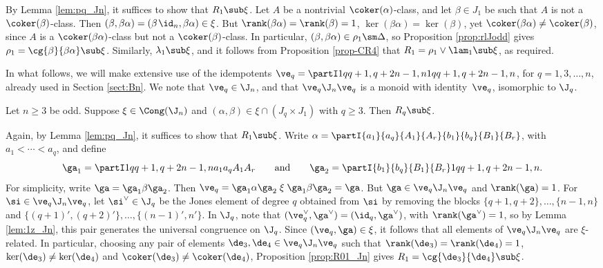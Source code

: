 \pf By Lemma \ref{lem:pq_Jn}, it suffices to show that $R_1\sub\xi$.  Let $A$ be a nontrivial $\coker(\alpha)$-class, and let $\beta\in J_1$ be such that $A$ is not a $\coker(\beta)$-class.  Then $(\beta,\beta\alpha)=(\beta\;\!\id_n,\beta\alpha)\in\xi$.  But $\rank(\beta\alpha)=\rank(\beta)=1$, $\ker(\beta\alpha)=\ker(\beta)$, yet $\coker(\beta\alpha)\not=\coker(\beta)$, since $A$ is a $\coker(\beta\alpha)$-class but not a $\coker(\beta)$-class.  In particular, $(\beta,\beta\alpha)\in\rho_1\sm\Delta$, so Proposition \ref{prop:rlJodd} gives $\rho_1=\cg{\beta}{\beta\alpha}\sub\xi$.  Similarly, $\lambda_1\sub\xi$, and it follows from Proposition \ref{prop-CR4} that $R_1=\rho_1\vee\lam_1\sub\xi$, as required. \epf

In what follows,
we will make extensive use of the idempotents $\ve_q=\partI1q{q+1,q+2}{n-1,n}1q{q+1,q+2}{n-1,n}$, for $q=1,3,\ldots,n$, already used in Section \ref{sect:Bn}.  We note that $\ve_q\in\J_n$, and that $\ve_q\J_n\ve_q$ is a monoid with identity~$\ve_q$, isomorphic to $\J_q$.

%
\begin{lemma}\label{lem:qz_Jn}
Let $n\geq3$ be odd.  Suppose $\xi\in\Cong(\J_n)$ and $(\alpha,\beta)\in\xi\cap (J_q\times J_1)$ with $q\geq3$.  Then $R_q\sub\xi$.
\end{lemma}

\pf Again, by Lemma \ref{lem:pq_Jn}, it suffices to show that $R_1\sub\xi$.  Write $\alpha=\partI{a_1}{a_q}{A_1}{A_r}{b_1}{b_q}{B_1}{B_r}$, with $a_1<\cdots<a_q$, and define
\[
\ga_1=\partI1q{q+1,q+2}{n-1,n}{a_1}{a_q}{A_1}{A_r}
\qquad\text{and}\qquad
\ga_2=\partI{b_1}{b_q}{B_1}{B_r}1q{q+1,q+2}{n-1,n}.
\]
For simplicity, write $\ga=\ga_1\beta\ga_2$.  
%
Then $\ve_q=\ga_1\alpha\ga_2\mathrel\xi\ga_1\beta\ga_2=\ga$.  But $\ga\in\ve_q\J_n\ve_q$ and ${\rank(\ga)=1}$.  
%
For $\si\in\ve_q\J_n\ve_q$, let $\si^\vee\in\J_q$ be the Jones element of degree $q$ obtained from $\si$ by removing the blocks ${\{q+1,q+2\},\ldots,\{n-1,n\}}$ and $\{(q+1)',(q+2)'\},\ldots,\{(n-1)',n'\}$.  
%
In $\J_q$, note that $(\ve_q^\vee,\ga^\vee)=(\id_q,\ga^\vee)$, with ${\rank(\ga^\vee)=1}$, so by Lemma \ref{lem:1z_Jn}, this pair generates the universal congruence on $\J_q$.  Since $(\ve_q,\ga)\in\xi$, it follows that all elements of $\ve_q\J_n\ve_q$ are $\xi$-related.  In particular, choosing any pair of elements $\de_3,\de_4\in\ve_q\J_n\ve_q$ such that $\rank(\de_3)=\rank(\de_4)=1$, $\ker(\de_3)\not=\ker(\de_4)$ and $\coker(\de_3)\not=\coker(\de_4)$, Proposition \ref{prop:R01_Jn} gives $R_1=\cg{\de_3}{\de_4}\sub\xi$.  \epf



